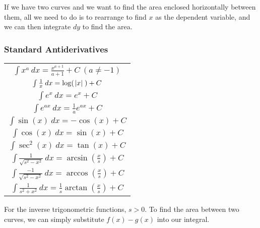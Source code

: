 \documentclass[12pt]{report}
\begin{document}
\begin{flushleft}
\bigskip
If we have two curves and we want to find the area enclosed horizontally 
between them, all we need to do is to rearrange to find \(x\) as the dependent
variable, and we can then integrate \(dy\) to find the area.

\subsubsection*{Standard Antiderivatives}
\begin{center}
    \begin{tabular}{||c||}
        \(\int x^a \:dx = \frac{x^{a + 1}}{a + 1} + C \: (a \neq -1)\) \\[7pt]
        \(\int \frac{1}{x} \:dx = \log(\;\abs{x}\;) + C\) \\[7pt]
        \(\int e^x \:dx = e^x + C\) \\[7pt]
        \(\int e^{ax} \:dx = \frac{1}{a}e^{ax} + C\) \\[7pt]
        \(\int \sin(x) \:dx = -\cos(x) + C\) \\[7pt]
        \(\int \cos(x) \:dx = \sin(x) + C\) \\[7pt]
        \(\int \sec^2(x) \:dx = \tan(x) + C\) \\[7pt]
        \(\int \frac{1}{\sqrt{s^2 - x^2}} \:dx = 
            \arcsin(\frac{x}{s}) + C\) \\[7pt]
        \(\int \frac{-1}{\sqrt{s^2 - x^2}} \:dx = 
            \arccos(\frac{x}{s}) + C\) \\[7pt]
        \(\int \frac{1}{s^2 + x^2} \:dx = 
            \frac{1}{s}\arctan(\frac{x}{s}) + C\) \\[7pt]
    \end{tabular}
\end{center}
For the inverse trigonometric functions, \(s > 0\). To find the area between
two curves, we can simply substitute \(f(x) - g(x)\) into our integral.


\end{flushleft}
\end{document}
